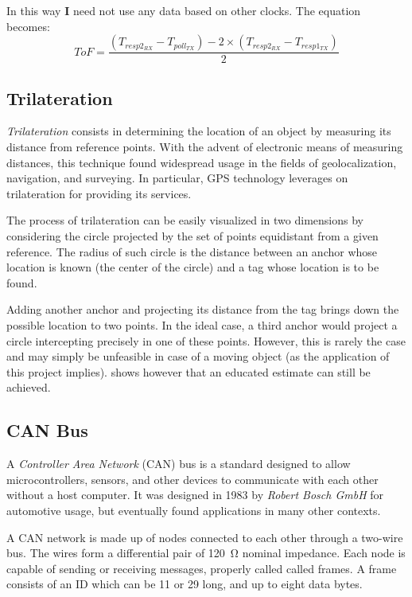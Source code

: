 In this way \(\mathbf{I}\) need not use any data based on other clocks.
The equation becomes:
\begin{equation}
    \textit{ToF} = \frac{(T_{resp2_{RX}} - T_{poll_{TX}}) - 2 \times (T_{resp2_{RX}} - T_{resp1_{TX}})}{2}
\end{equation}


\subsection{Trilateration}
\emph{Trilateration} consists in determining the location of an object by measuring its distance from reference points.
With the advent of electronic means of measuring distances, this technique found widespread usage in the fields of geolocalization, navigation, and surveying.
In particular, GPS technology leverages on trilateration for providing its services.

The process of trilateration can be easily visualized in two dimensions by considering the circle projected by the set of points equidistant from a given reference.
The radius of such circle is the distance between an anchor whose location is known (the center of the circle) and a tag whose location is to be found.


Adding another anchor and projecting its distance from the tag brings down the possible location to two points.
In the ideal case, a third anchor would project a circle intercepting precisely in one of these points.
However, this is rarely the case and may simply be unfeasible in case of a moving object (as the application of this project implies).  shows however that an educated estimate can still be achieved.


\subsection{CAN Bus}
A \emph{Controller Area Network} (CAN) bus is a standard designed to allow microcontrollers, sensors, and other devices to communicate with each other without a host computer.
It was designed in 1983 by \emph{Robert Bosch GmbH} for automotive usage, but eventually found applications in many other contexts.

A CAN network is made up of nodes connected to each other through a two-wire bus.
The wires form a differential pair of \SI{120}{\ohm} nominal impedance.
Each node is capable of sending or receiving messages, properly called called frames.
A frame consists of an ID which can be \SI{11}{\bit} or \SI{29}{\bit} long, and up to eight data bytes.

